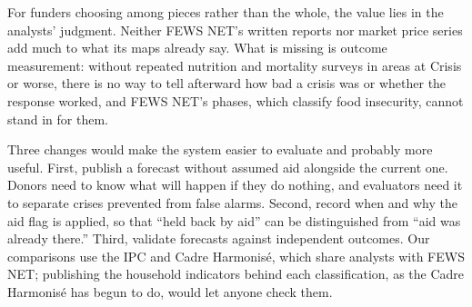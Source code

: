 \documentclass[11pt]{article}
\begin{document}
For funders choosing among pieces rather than the whole, the value lies in the analysts' judgment. Neither FEWS NET's written reports nor market price series add much to what its maps already say. What is missing is outcome measurement: without repeated nutrition and mortality surveys in areas at Crisis or worse, there is no way to tell afterward how bad a crisis was or whether the response worked, and FEWS NET's phases, which classify food insecurity, cannot stand in for them.

Three changes would make the system easier to evaluate and probably more useful. First, publish a forecast without assumed aid alongside the current one. Donors need to know what will happen if they do nothing, and evaluators need it to separate crises prevented from false alarms. Second, record when and why the aid flag is applied, so that ``held back by aid'' can be distinguished from ``aid was already there.'' Third, validate forecasts against independent outcomes. Our comparisons use the IPC and Cadre Harmonis\'e, which share analysts with FEWS NET; publishing the household indicators behind each classification, as the Cadre Harmonis\'e has begun to do, would let anyone check them.

\newpage


\end{document}

